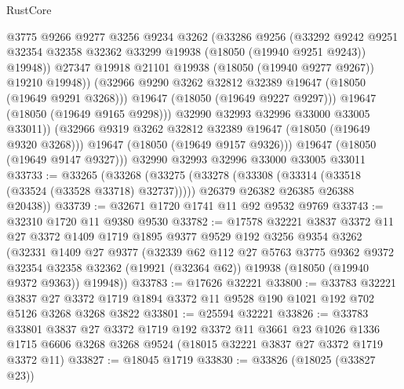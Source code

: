 \begin{lexlean}{RustCore}
\begin{coremodule}
                    @3775
                    @9266
                    @9277
                    @3256
                    @9234
                    @3262
                    (@33286
                      @9256
                      (@33292
                        @9242
                        @9251
                        @32354
                        @32358
                        @32362
                        @33299
                        @19938
                        (@18050 (@19940 @9251 @9243))
                        @19948))
                    @27347
                    @19918
                    @21101
                    @19938
                    (@18050 (@19940 @9277 @9267))
                    @19210
                    @19948))
                (@32966 @9290 @3262 @32812 @32389 @19647 (@18050 (@19649 @9291 @3268)))
                @19647
                (@18050 (@19649 @9227 @9297)))
              @19647
              (@18050 (@19649 @9165 @9298)))
            @32990
            @32993
            @32996
            @33000
            @33005
            @33011))
        (@32966 @9319 @3262 @32812 @32389 @19647 (@18050 (@19649 @9320 @3268)))
        @19647
        (@18050 (@19649 @9157 @9326)))
      @19647
      (@18050 (@19649 @9147 @9327)))
    @32990
    @32993
    @32996
    @33000
    @33005
    @33011
@33733 := @33265
    (@33268
      (@33275
        (@33278 (@33308 (@33314 (@33518 (@33524 (@33528 @33718) @32737)))))
        @26379
        @26382
        @26385
        @26388
        @20438))
@33739 := @32671 @1720 @1741 @11 @92 @9532 @9769
@33743 := @32310 @1720 @11 @9380 @9530
@33782 := @17578
    @32221
    @3837
    @3372
    @11
    @27
    @3372
    @1409
    @1719
    @1895
    @9377
    @9529
    @192
    @3256
    @9354
    @3262
    (@32331
      @1409
      @27
      @9377
      (@32339
        @62
        @112
        @27
        @5763
        @3775
        @9362
        @9372
        @32354
        @32358
        @32362
        (@19921 (@32364 @62))
        @19938
        (@18050 (@19940 @9372 @9363))
        @19948))
@33783 := @17626 @32221
@33800 := @33783
    @32221
    @3837
    @27
    @3372
    @1719
    @1894
    @3372
    @11
    @9528
    @190
    @1021
    @192
    @702
    @5126
    @3268
    @3268
    @3822
@33801 := @25594 @32221
@33826 := @33783
    @33801
    @3837
    @27
    @3372
    @1719
    @192
    @3372
    @11
    @3661
    @23
    @1026
    @1336
    @1715
    @6606
    @3268
    @3268
    @9524
    (@18015 @32221 @3837 @27 @3372 @1719 @3372 @11)
@33827 := @18045 @1719
@33830 := @33826 (@18025 (@33827 @23))

\end{coremodule}
\end{lexlean}
